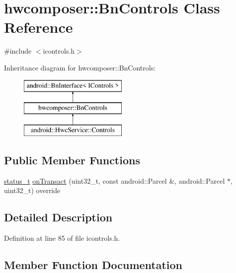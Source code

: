 \hypertarget{classhwcomposer_1_1BnControls}{}\section{hwcomposer\+:\+:Bn\+Controls Class Reference}
\label{classhwcomposer_1_1BnControls}


{\ttfamily \#include $<$icontrols.\+h$>$}

Inheritance diagram for hwcomposer\+:\+:Bn\+Controls\+:\begin{figure}[H]
\begin{center}
\leavevmode
\includegraphics[height=3.000000cm]{classhwcomposer_1_1BnControls}
\end{center}
\end{figure}
\subsection*{Public Member Functions}
\begin{DoxyCompactItemize}
\item 
\mbox{\hyperlink{hwcserviceapi_8h_a3806fb2027d9a316d8ca8d9b8b8eb96f}{status\+\_\+t}} \mbox{\hyperlink{classhwcomposer_1_1BnControls_a335d9026455cc400f6a83e7529fd7cea}{on\+Transact}} (uint32\+\_\+t, const android\+::\+Parcel \&, android\+::\+Parcel $\ast$, uint32\+\_\+t) override
\end{DoxyCompactItemize}


\subsection{Detailed Description}


Definition at line 85 of file icontrols.\+h.



\subsection{Member Function Documentation}
\mbox{\label{classhwcomposer_1_1BnControls_a335d9026455cc400f6a83e7529fd7cea}} 
